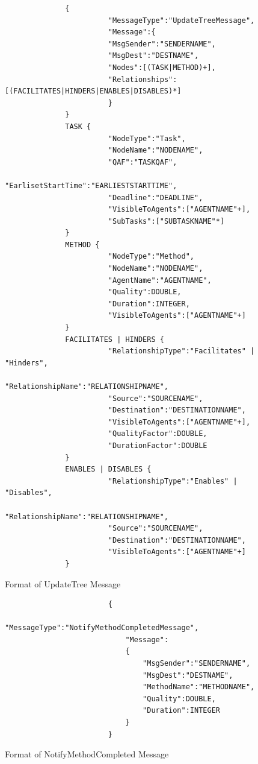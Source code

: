 \begin{enumerate}
\begin{figure}[H]
\begin{verbatim}
              {
                        "MessageType":"UpdateTreeMessage",
                        "Message":{
                        "MsgSender":"SENDERNAME",
                        "MsgDest":"DESTNAME",
                        "Nodes":[(TASK|METHOD)+],
                        "Relationships":[(FACILITATES|HINDERS|ENABLES|DISABLES)*]
                        }
              }
              TASK {
                        "NodeType":"Task",
                        "NodeName":"NODENAME",
                        "QAF":"TASKQAF",
                        "EarlisetStartTime":"EARLIESTSTARTTIME",
                        "Deadline":"DEADLINE",
                        "VisibleToAgents":["AGENTNAME"+],
                        "SubTasks":["SUBTASKNAME"*]
              }
              METHOD {
                        "NodeType":"Method",
                        "NodeName":"NODENAME",
                        "AgentName":"AGENTNAME",
                        "Quality":DOUBLE,
                        "Duration":INTEGER,
                        "VisibleToAgents":["AGENTNAME"+]
              }
              FACILITATES | HINDERS {
                        "RelationshipType":"Facilitates" | "Hinders",
                        "RelationshipName":"RELATIONSHIPNAME",
                        "Source":"SOURCENAME",
                        "Destination":"DESTINATIONNAME",
                        "VisibleToAgents":["AGENTNAME"+],
                        "QualityFactor":DOUBLE,
                        "DurationFactor":DOUBLE
              }
              ENABLES | DISABLES {
                        "RelationshipType":"Enables" | "Disables",
                        "RelationshipName":"RELATIONSHIPNAME",
                        "Source":"SOURCENAME",
                        "Destination":"DESTINATIONNAME",
                        "VisibleToAgents":["AGENTNAME"+]
              }
\end{verbatim}
\caption{Format of UpdateTree Message}
\label{fig:UpdateTreeMessage}
\end{figure}

\begin{figure}[H]
\centering
\begin{verbatim}
                        {
	                        "MessageType":"NotifyMethodCompletedMessage",
 	                        "Message":
 	                        {
 	                        	"MsgSender":"SENDERNAME",
 	                        	"MsgDest":"DESTNAME",
 	                        	"MethodName":"METHODNAME",
 	                        	"Quality":DOUBLE,
 	                        	"Duration":INTEGER
 	                        }
                        }
\end{verbatim}
\caption{Format of NotifyMethodCompleted Message}
\label{fig:NotifyMethodCompleted}
\end{figure}


\end{enumerate}
